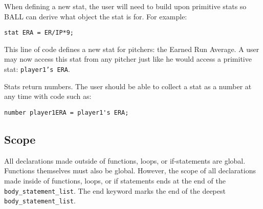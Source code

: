 When defining a new stat, the user will need to build upon primitive
stats so BALL can derive what object the stat is for. For example:

\begin{verbatim}
stat ERA = ER/IP*9;
\end{verbatim}

This line of code defines a new stat for pitchers: the Earned Run
Average. A user may now access this 
stat from any pitcher just like he would access a primitive stat:
\texttt{player1's ERA}.

Stats return numbers. The user should be able to collect a stat as
a number at any time with code such as: 

\begin{verbatim}
number player1ERA = player1's ERA;
\end{verbatim}

\subsection{Scope}
All declarations made outside of functions, loops, or if-statements
are global. Functions themselves must also be global. However, the
scope of all declarations made inside of functions, loops, or if
statements ends at the end of the \texttt{body\_statement\_list}. The
end keyword marks the end of the deepest
\texttt{body\_statement\_list}.
